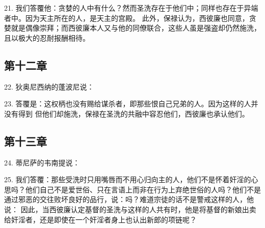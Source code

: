 21. 我们答覆他：贪婪的人中有什么？然而圣洗存在于他们中；同样也存在于异端者中。因为天主所在的人，是天主的宫殿。 此外，保禄认为，西彼廉也同意，贪婪就是偶像崇拜；而西彼廉本人又与他的同僚联合，这些人虽是强盗却仍然施洗，且以极大的忍耐报酬相待。\par


\subsection{第十二章}

22. 狄奥尼西纳的蓬波尼说：\par

23. 答覆是：这权柄也没有赐给谋杀者，即那些恨自己兄弟的人。因为这样的人并没有得到 但他们却施洗，保禄在圣洗的共融中容忍他们，西彼廉也承认他们。\par


\subsection{第十三章}

24. 蒂尼萨的韦南提说：\par

25. 我们答覆：那些受洗时只用嘴唇而不用心归向主的人，他们不是怀着奸淫的心思吗？他们自己不是爱世俗、只在言语上而非在行为上弃绝世俗的人吗？他们不是通过邪恶的交往败坏良好的品行，说：吗？难道宗徒的话不是警戒这样的人，他说： 因此，当西彼廉认定基督的圣洗与这样的人共有时，他是将基督的新娘出卖给奸淫者，还是即使在一个奸淫者身上也认出新郎的项链呢？\par

